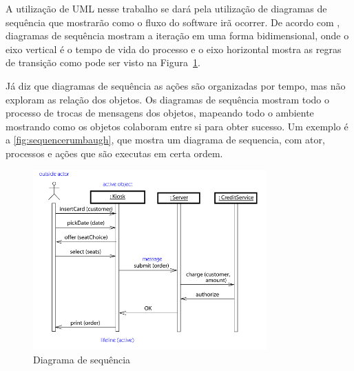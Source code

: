A utilização de UML nesse trabalho se dará pela utilização de diagramas de sequência que mostrarão como o fluxo do software irã ocorrer. De acordo com , diagramas de sequência mostram a iteração em uma forma bidimensional, onde o eixo vertical é o tempo de vida do processo e o eixo horizontal mostra as regras de transição como pode ser visto na Figura~\ref{fig:sequencerumbaugh}. %


Já  diz que diagramas de sequência as ações são organizadas por tempo, mas não exploram as relação dos objetos. Os diagramas de sequência mostram todo o processo de trocas de mensagens dos objetos, mapeando todo o ambiente mostrando como os objetos colaboram entre si para obter sucesso. Um exemplo é a \autoref{fig:sequencerumbaugh}, que mostra um diagrama de sequencia, com ator, processos e ações que são executas em certa ordem. 
 \begin{figure}[H]
	\centering
    	\caption{\label{fig:sequencerumbaugh} Diagrama de sequência }
		\includegraphics[width = 0.8\textwidth]	{resources/sequencediagramrumbaugh}
\end{figure}







